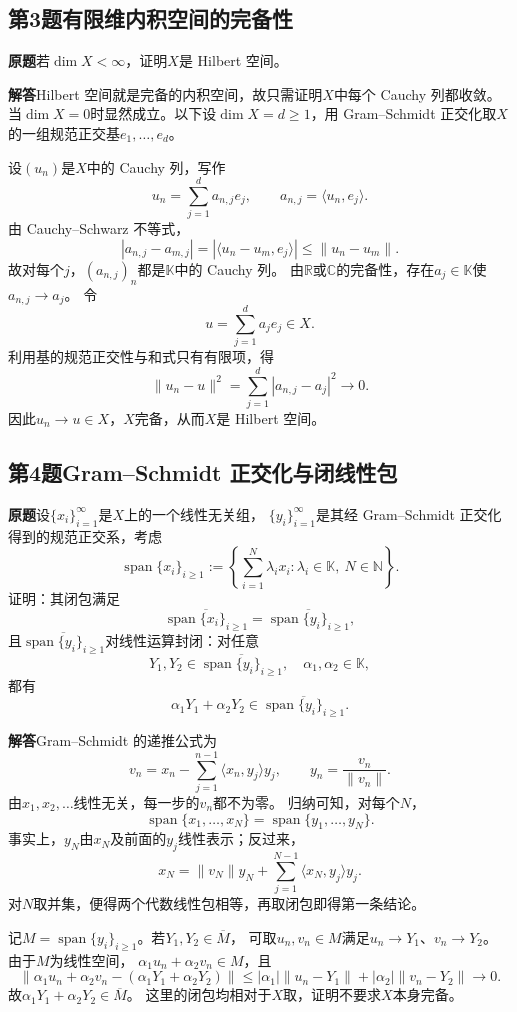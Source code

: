 \documentclass[11pt,a4paper]{ctexart}
\newcommand{\R}{\mathbb R}
\newcommand{\C}{\mathbb C}
\newcommand{\K}{\mathbb K}
\newcommand{\N}{\mathbb N}
\newcommand{\norm}[1]{\lVert#1\rVert}
\newcommand{\ip}[2]{\langle#1,#2\rangle}
\newcommand{\spn}{\operatorname{span}}
\newcommand{\problem}{\par\textbf{原题}\quad}
\newcommand{\solution}{\par\medskip\textbf{解答}\quad}
\begin{document}
\subsection*{第3题\quad 有限维内积空间的完备性}
\problem 若$\dim X<\infty$，证明$X$是 Hilbert 空间。

\solution Hilbert 空间就是完备的内积空间，故只需证明$X$中每个 Cauchy 列都收敛。
当$\dim X=0$时显然成立。以下设$\dim X=d\ge1$，用 Gram--Schmidt
正交化取$X$的一组规范正交基$e_1,\ldots,e_d$。

设$(u_n)$是$X$中的 Cauchy 列，写作
\[
 u_n=\sum_{j=1}^{d}a_{n,j}e_j,\qquad a_{n,j}=\ip{u_n}{e_j}.
\]
由 Cauchy--Schwarz 不等式，
\[
 |a_{n,j}-a_{m,j}|
   =|\ip{u_n-u_m}{e_j}|
   \le\norm{u_n-u_m}.
\]
故对每个$j$，$(a_{n,j})_n$都是$\K$中的 Cauchy 列。
由$\R$或$\C$的完备性，存在$a_j\in\K$使$a_{n,j}\to a_j$。
令
\[
 u=\sum_{j=1}^{d}a_je_j\in X.
\]
利用基的规范正交性与和式只有有限项，得
\[
 \norm{u_n-u}^2=\sum_{j=1}^{d}|a_{n,j}-a_j|^2\longrightarrow0.
\]
因此$u_n\to u\in X$，$X$完备，从而$X$是 Hilbert 空间。

\newpage
\subsection*{第4题\quad Gram--Schmidt 正交化与闭线性包}
\problem 设$\{x_i\}_{i=1}^{\infty}$是$X$上的一个线性无关组，
$\{y_i\}_{i=1}^{\infty}$是其经 Gram--Schmidt 正交化得到的规范正交系，考虑
\[
 \spn\{x_i\}_{i\ge1}
 :=\left\{\sum_{i=1}^{N}\lambda_i x_i:
        \lambda_i\in\K,\ N\in\N\right\}.
\]
证明：其闭包满足
\[
 \overline{\spn\{x_i\}_{i\ge1}}
   =\overline{\spn\{y_i\}_{i\ge1}},
\]
且$\overline{\spn\{y_i\}_{i\ge1}}$对线性运算封闭：对任意
\[
 Y_1,Y_2\in\overline{\spn\{y_i\}_{i\ge1}},\quad
 \alpha_1,\alpha_2\in\K,
\]
都有
\[
 \alpha_1Y_1+\alpha_2Y_2
    \in\overline{\spn\{y_i\}_{i\ge1}}.
\]

\solution Gram--Schmidt 的递推公式为
\[
 v_n=x_n-\sum_{j=1}^{n-1}\ip{x_n}{y_j}y_j,\qquad
 y_n=\frac{v_n}{\norm{v_n}}.
\]
由$x_1,x_2,\ldots$线性无关，每一步的$v_n$都不为零。
归纳可知，对每个$N$，
\[
 \spn\{x_1,\ldots,x_N\}
   =\spn\{y_1,\ldots,y_N\}.
\]
事实上，$y_N$由$x_N$及前面的$y_j$线性表示；反过来，
\[
 x_N=\norm{v_N}y_N+\sum_{j=1}^{N-1}\ip{x_N}{y_j}y_j.
\]
对$N$取并集，便得两个代数线性包相等，再取闭包即得第一条结论。

记$M=\spn\{y_i\}_{i\ge1}$。若$Y_1,Y_2\in\overline M$，
可取$u_n,v_n\in M$满足$u_n\to Y_1$、$v_n\to Y_2$。
由于$M$为线性空间，
$\alpha_1u_n+\alpha_2v_n\in M$，且
\[
 \norm{\alpha_1u_n+\alpha_2v_n-(\alpha_1Y_1+\alpha_2Y_2)}
 \le|\alpha_1|\norm{u_n-Y_1}+|\alpha_2|\norm{v_n-Y_2}
 \longrightarrow0.
\]
故$\alpha_1Y_1+\alpha_2Y_2\in\overline M$。
这里的闭包均相对于$X$取，证明不要求$X$本身完备。
\end{document}

